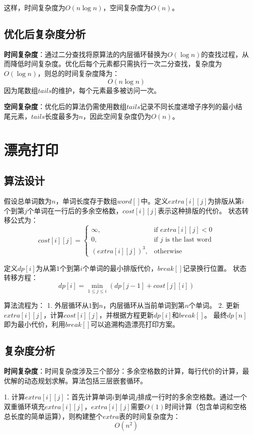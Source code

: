 \documentclass[UTF8]{ctexart}
\begin{document}
这样，时间复杂度为$O(n \log n)$，空间复杂度为$O(n)$。
\subsection{优化后复杂度分析}


\textbf{时间复杂度}：通过二分查找将原算法的内层循环替换为$O(\log n)$的查找过程，从而降低时间复杂度。优化后每个元素都只需执行一次二分查找，复杂度为$O(\log n)$，则总的时间复杂度降为：
\[
O(n \log n)
\]
因为尾数组$tails$的维护，每个元素最多被访问一次。

\textbf{空间复杂度}：优化后的算法仍需使用数组$tails$记录不同长度递增子序列的最小结尾元素，$tails$长度最多为$n$，因此空间复杂度仍为$O(n)$。


\section{漂亮打印}

\subsection{算法设计}
假设总单词数为$n$，单词长度存于数组$word[]$中。定义$extra[i][j]$为排版从第$i$个到第$j$个单词在一行后的多余空格数，$cost[i][j]$表示这种排版的代价。
状态转移公式为：
\[
cost[i][j] = 
\begin{cases} 
    \infty, & \text{if } extra[i][j] < 0 \\ 
    0, & \text{if } j \text{ is the last word} \\ 
    (extra[i][j])^3, & \text{otherwise} 
\end{cases}
\]

定义$dp[i]$为从第$1$个到第$i$个单词的最小排版代价，$break[]$记录换行位置。
状态转移方程：
\[
dp[i] = \min_{1 \leq j \leq i} \left(dp[j-1] + cost[j][i]\right)
\]

算法流程为：
1. 外层循环从$1$到$n$，内层循环从当前单词到第$n$个单词。
2. 更新$extra[i][j]$，计算$cost[i][j]$，并根据方程更新$dp[i]$和$break[]$。
最终$dp[n]$即为最小代价，利用$break[]$可以追溯构造漂亮打印方案。

\subsection{复杂度分析}
\textbf{时间复杂度}：时间复杂度涉及三个部分：多余空格数的计算，每行代价的计算，最优解的动态规划求解。算法包括三层嵌套循环。

1. 计算$extra[i][j]$：首先计算单词$i$到单词$j$排成一行时的多余空格数。通过一个双重循环填充$extra[i][j]$，$extra[i][j]$需要$O(1)$时间计算（包含单词和空格总长度的简单运算），则构建整个$extra$表的时间复杂度为：
   \[
   O(n^2)
   \]
\end{document}

